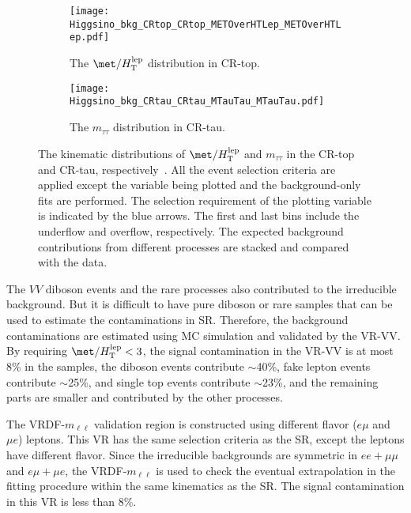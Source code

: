 \begin{figure}[ht]
    \begin{center}
        \begin{subfigure}[b]{0.48\textwidth}
            \texttt{[image: Higgsino\_bkg\_CRtop\_CRtop\_METOverHTLep\_METOverHTLep.pdf]}
            \caption{{\footnotesize The $\met/H_\mathrm{T}^\mathrm{lep}$ distribution in CR-top.}}
            \label{fig:bkg_kinematic_metOverHT_CRtop}
        \end{subfigure}
        \begin{subfigure}[b]{0.48\textwidth}
            \texttt{[image: Higgsino\_bkg\_CRtau\_CRtau\_MTauTau\_MTauTau.pdf]}
            \caption{The $m_{\tau \tau}$ distribution in CR-tau.}
            \label{fig:bkg_kinematic_mtautau_CRtau}
        \end{subfigure}
        \caption{The kinematic distributions of $\met/H_\mathrm{T}^\mathrm{lep}$ and $m_{\tau \tau}$ in the CR-top and CR-tau, respectively~\cite{Aaboud:2017leg}.
        All the event selection criteria are applied except the variable being plotted and the background-only fits are performed.
        The selection requirement of the plotting variable is indicated by the blue arrows.
        The first and last bins include the underflow and overflow, respectively.
        The expected background contributions from different processes are stacked and compared with the data.}
        \label{fig:bkg_kinematic_distributions_in_CRs}
    \end{center}
\end{figure}

The $VV$ diboson events and the rare processes also contributed to the irreducible background.
But it is difficult to have pure diboson or rare samples that can be used to estimate the contaminations in SR.
Therefore, the background contaminations are estimated using MC simulation and validated by the VR-VV.
By requiring $\met/H_\mathrm{T}^\mathrm{lep} < 3$, the signal contamination in the VR-VV is at most 8\% in the samples, the diboson events contribute $\sim$40\%, fake lepton events contribute $\sim$25\%, \ttbar and single top events contribute $\sim$23\%, and the remaining parts are smaller and contributed by the other processes.

The VRDF-$m_{\ell \ell}$ validation region is constructed using different flavor ($e\mu$ and $\mu e$) leptons.
This VR has the same selection criteria as the SR, except the leptons have different flavor.
Since the irreducible backgrounds are symmetric in $ee+\mu\mu$ and $e\mu+\mu e$, the VRDF-$m_{\ell \ell}$ is used to check the eventual extrapolation in the fitting procedure within the same kinematics as the SR.
The signal contamination in this VR is less than 8\%.

